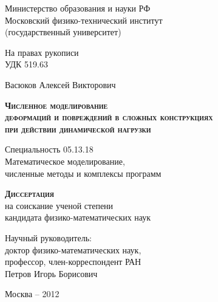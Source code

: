 \begin{titlepage}
\newpage

\begin{center}
Министерство образования и науки РФ\\
Московский физико-технический институт\\
(государственный университет)\\
\end{center}

\vspace{0.3em}

\begin{flushright}
На правах рукописи \\
УДК 519.63
\end{flushright}

\vspace{1em}

\begin{center}
Васюков Алексей Викторович
\end{center}

\vspace{1em}

\begin{center}
\textsc{\textbf{Численное моделирование\\
деформаций и повреждений в сложных конструкциях\\
при действии динамической нагрузки}}
\end{center}

\vspace{1.0em}

\begin{center}
Специальность 05.13.18\\
Математическое моделирование,\\
численные методы и комплексы программ
\end{center}

\vspace{0.5em}

\begin{center}
\textsc{\textbf{Диссертация}}\\
на соискание ученой степени\\
кандидата физико-математических наук
\end{center}

\vspace{1em}

\begin{flushright}
Научный руководитель:\\
доктор физико-математических наук,\\
профессор, член-корреспондент РАН\\
Петров Игорь Борисович
\end{flushright}

\vspace{\fill}
\begin{center}
Москва -- 2012
\end{center}

\end{titlepage}

